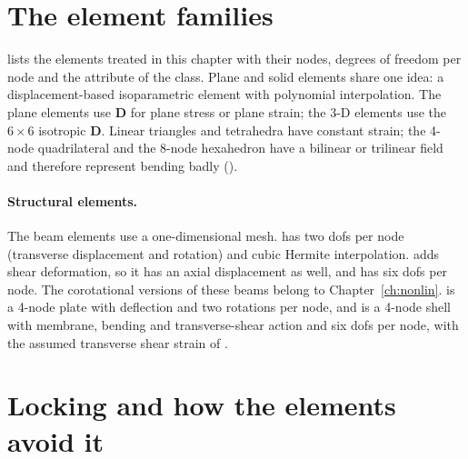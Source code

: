 \section{The element families}\label{sec:el-families}

 lists the elements treated in this chapter with their nodes, degrees of freedom per node and the  attribute of the class. Plane and solid elements share one idea: a displacement-based isoparametric element with polynomial interpolation. The plane elements use $\bm D$ for plane stress or plane strain; the 3-D elements use the $6\times6$ isotropic $\bm D$. Linear triangles and tetrahedra have constant strain; the 4-node quadrilateral and the 8-node hexahedron have a bilinear or trilinear field and therefore represent bending badly ().

\begin{table}[ht]
\centering\small

\caption{Elements of this chapter.  is the attribute of the class as it stands in tag \booktag; its meaning is the number of points per direction for quadrilaterals and hexahedra, and a simplex rule order for triangles and tetrahedra.}\label{tab:el-elements}
\end{table}

\paragraph{Structural elements.}
The beam elements use a one-dimensional mesh.  has two dofs per node (transverse displacement and rotation) and cubic Hermite interpolation.  adds shear deformation, so it has an axial displacement as well, and  has six dofs per node. The corotational versions of these beams belong to Chapter~\ref{ch:nonlin}.  is a 4-node plate with deflection and two rotations per node, and  is a 4-node shell with membrane, bending and transverse-shear action and six dofs per node, with the assumed transverse shear strain of \citet{dvorkin1984}.

\section{Locking and how the elements avoid it}\label{sec:el-locking}

